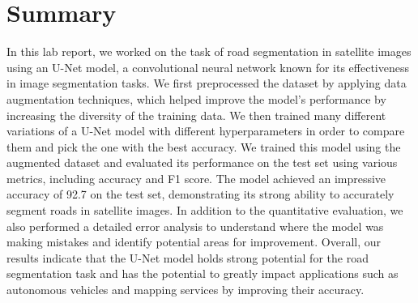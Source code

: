 \documentclass[10pt,conference,compsocconf]{IEEEtran}
\begin{document}
\section{Summary}
In this lab report, we worked on the task of road segmentation in satellite images using an U-Net model, a convolutional neural network known for its effectiveness in image segmentation tasks. We first preprocessed the dataset by applying data augmentation techniques, which helped improve the model's performance by increasing the diversity of the training data. We then trained many different variations of a U-Net model with different hyperparameters in order to compare them and pick the one with the best accuracy. We trained this model using the augmented dataset and evaluated its performance on the test set using various metrics, including accuracy and F1 score. The model achieved an impressive accuracy of 92.7 on the test set, demonstrating its strong ability to accurately segment roads in satellite images. In addition to the quantitative evaluation, we also performed a detailed error analysis to understand where the model was making mistakes and identify potential areas for improvement. Overall, our results indicate that the U-Net model holds strong potential for the road segmentation task and has the potential to greatly impact applications such as autonomous vehicles and mapping services by improving their accuracy.




\end{document}
